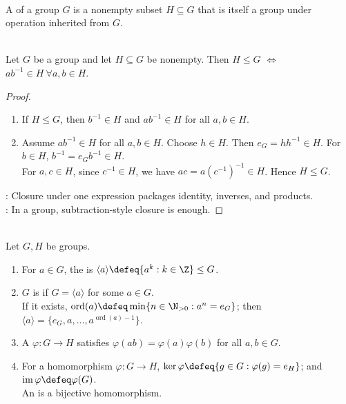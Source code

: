 \begin{definition} \label{def:subgroup} \\
A  of a group $G$ is a nonempty subset $H\subseteq G$ that is itself a group under operation inherited from $G$.
\end{definition}

\begin{proposition} \label{prop:subgroup-test} \\
Let $G$ be a group and let $H\subseteq G$ be nonempty. Then $H\leq G$ $\iff$ $ab^{-1}\in H \ \forall a,b\in H$.
\begin{proof}
\begin{enumerate}[label=\roman*.]
\setlength{\itemsep}{0pt}
\item[$(\Rightarrow)$] If $H\leq G$, then $b^{-1}\in H$ and $ab^{-1}\in H$ for all $a,b\in H$.
\item[$(\Leftarrow)$] Assume $ab^{-1}\in H$ for all $a,b\in H$. Choose $h\in H$. Then $e_G=hh^{-1}\in H$. For $b\in H$, $b^{-1}=e_Gb^{-1}\in H$.\\
For $a,c\in H$, since $c^{-1}\in H$, we have $ac=a(c^{-1})^{-1}\in H$. Hence $H\leq G$.
\end{enumerate}
: Closure under one expression packages identity, inverses, and products.\\
: In a group, subtraction-style closure is enough.
\end{proof}
\end{proposition}

\begin{definition} \label{def:cyclic-group-and-generated-subgroup} \label{def:group-homomorphism-kernel-image} \\
Let $G,H$ be groups.
\begin{enumerate}[label=(\roman*)]
\setlength{\itemsep}{0pt}
\item For $a\in G$, the  is $\langle a\rangle\defeq\{a^k:k\in\Z\}\leq G$.
\item $G$ is  if $G=\langle a\rangle$ for some $a\in G$.\\
If it exists, $\operatorname{ord}(a)\defeq\min\{n\in\N_{>0}:a^n=e_G\}$; then $\langle a\rangle=\{e_G,a,\ldots,a^{\operatorname{ord}(a)-1}\}$.
\item A  $\varphi:G\to H$ satisfies $\varphi(ab)=\varphi(a)\varphi(b)$ for all $a,b\in G$.
\item For a homomorphism $\varphi:G\to H$, $\ker\varphi\defeq\{g\in G:\varphi(g)=e_H\}$; and $\operatorname{im}\varphi\defeq\varphi(G)$.\\
An  is a bijective homomorphism.
\end{enumerate}
\end{definition}

